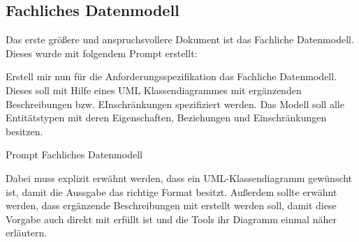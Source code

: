 \subsection*{Fachliches Datenmodell}

Das erste größere und anspruchsvollere Dokument ist das Fachliche Datenmodell. Dieses wurde mit folgendem Prompt erstellt:

\begin{prompt}[H]
    \begin{tcolorbox}[colback=gray!20, colframe=gray!20, boxrule=0pt, sharp corners] 
        Erstell mir nun für die Anforderungsspezifikation das Fachliche Datenmodell. Dieses soll mit Hilfe eines UML Klassendiagrammes mit ergänzenden Beschreibungen 
        bzw. EInschränkungen spezifiziert werden. Das Modell soll alle Entitätstypen mit deren Eigenschaften, Beziehungen und Einschränkungen besitzen.
        \vfill
    \end{tcolorbox}
    \caption{Prompt Fachliches Datenmodell}
    \label{Prompt Fachliches Datenmodell}
\end{prompt}

Dabei muss explizit erwähnt werden, dass ein UML-Klassendiagramm gewünscht ist, damit die Aussgabe das richtige Format besitzt. Außerdem sollte erwähnt werden,
dass ergänzende Beschreibungen mit erstellt werden soll, damit diese Vorgabe auch direkt mit erfüllt ist und die Tools ihr Diagramm einmal näher erläutern.\\

